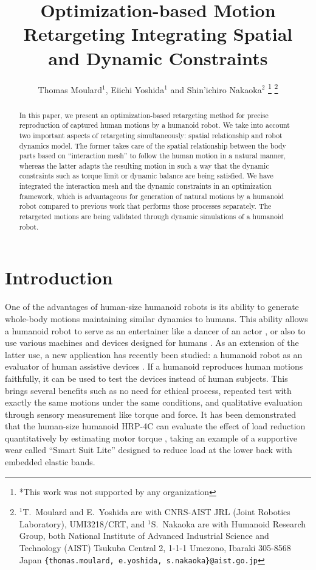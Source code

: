 \documentclass[letterpaper, 10 pt, conference]{ieeeconf}  %
\title{\LARGE \bf
Optimization-based Motion Retargeting Integrating Spatial and Dynamic Constraints
}
\author{Thomas Moulard$^{1}$, Eiichi Yoshida$^{1}$ and Shin'ichiro
  Nakaoka$^{2}$%
\thanks{*This work was not supported by any organization}%
\thanks{$^{1}$T.~Moulard and E.~Yoshida are with CNRS-AIST JRL (Joint
  Robotics Laboratory), UMI3218/CRT, and $^{1}$S.~Nakaoka are with
  Humanoid Research Group, both National Institute of Advanced Industrial Science and Technology (AIST)
Tsukuba Central 2, 1-1-1 Umezono, Ibaraki 305-8568 Japan
        {\tt\footnotesize \{thomas.moulard, e.yoshida, s.nakaoka\}@aist.go.jp}}%
}
\begin{document}
\maketitle
\thispagestyle{empty}
\pagestyle{empty}


\begin{abstract}
In this paper, we present an optimization-based retargeting method for
precise reproduction of captured human motions by a humanoid robot.
We take into account two important aspects of retargeting
simultaneously: spatial relationship and robot dynamics model.  The
former takes care of the spatial relationship between the body parts
based on ``interaction mesh'' to follow the human motion in a natural
manner, whereas the latter adapts the resulting motion in such a way
that the dynamic constraints such as torque limit or dynamic balance
are being satisfied.  We have integrated the interaction mesh and the
dynamic constraints in an optimization framework, which is
advantageous for generation of natural motions by a humanoid robot
compared to previous work that performs those processes
separately. The retargeted motions are being validated through dynamic
simulations of a humanoid robot.
\end{abstract}


\section{Introduction}
\label{sec:intro}

One of the advantages of human-size humanoid robots is
its ability to generate whole-body motions maintaining similar
dynamics to humans.
This ability allows a humanoid robot to serve as an entertainer like
a dancer of an actor \cite{nakaoka_iros2010}, or also to use various
machines and devices designed for humans \cite{Yokoi03iros}.
As an extension of the latter use, a new application
has recently been studied: a humanoid robot as an evaluator of human
assistive devices \cite{Takanishi06ICRA,Miura13ICRA}.
If a humanoid reproduces human motions faithfully, it can be used to
test the devices instead of human subjects.
This brings several benefits such as no need for ethical
process, repeated test with exactly the same motions under the same
conditions, and qualitative evaluation through sensory measurement
like torque and force.
It has been demonstrated that the human-size humanoid HRP-4C
\cite{Kaneko09Humanoids}  can evaluate the effect of load reduction
quantitatively by estimating motor torque \cite{Miura13ICRA}, taking
an example of a supportive wear called ``Smart Suit Lite''
\cite{Tanaka11JRM} designed to reduce load
at the lower back with embedded elastic bands.
\end{document}
